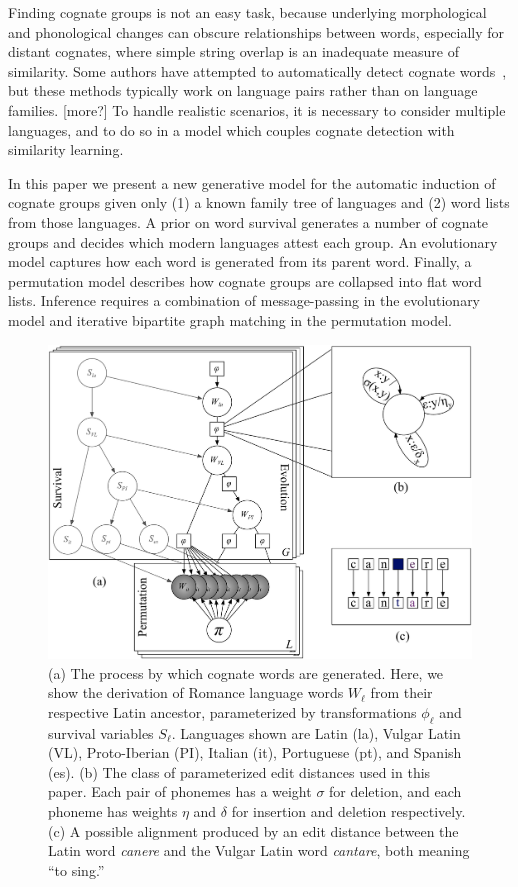 \documentclass[11pt,a4paper]{article}
\begin{document}
Finding cognate groups is not an easy task, because underlying
morphological and phonological changes can obscure relationships
between words, especially for distant cognates, where simple string
overlap is an inadequate measure of similarity.  Some authors have
attempted to automatically detect cognate
words~\cite{lowe94reconstruction,oakes00computer,Kondrak01identifyingcognates,mulloni07automatic},
but these methods typically work on language pairs rather than on
language families.  [more?]  To handle realistic scenarios, it is
necessary to consider multiple languages, and to do so in a model
which couples cognate detection with similarity learning.

In this paper we present a new generative model for the automatic
induction of cognate groups given only (1) a known family tree of
languages and (2) word lists from those languages.  A prior on word
survival generates a number of cognate groups and decides which
modern languages attest each group.  An evolutionary model captures
how each word is generated from its parent word.  Finally, a
permutation model describes how cognate groups are collapsed into
flat word lists.  Inference requires a combination of message-passing
in the evolutionary model and iterative bipartite graph matching
in the permutation model.

\begin{figure}
  \centering
  \includegraphics[scale=0.35]{gmodel}
  \caption{(a) The process by which cognate words are generated.
  Here, we show the derivation of Romance language words $W_\ell$
  from their respective Latin ancestor, parameterized by transformations
  $\phi_\ell$ and survival variables $S_\ell$. Languages shown are
  Latin (la), Vulgar Latin (VL), Proto-Iberian (PI), Italian (it),
  Portuguese (pt), and Spanish (es). 
  (b) The class of parameterized edit distances used in this paper.
  Each pair of phonemes has a weight $\sigma$ for deletion, and
  each phoneme has weights $\eta$ and $\delta$ for insertion and
  deletion respectively.
  (c) A possible alignment produced by an edit distance between the
  Latin word \textit{canere} and the Vulgar Latin word \textit{cantare},
  both meaning ``to sing.''} \label{fig:gmodel}
\end{figure}
\end{document}
